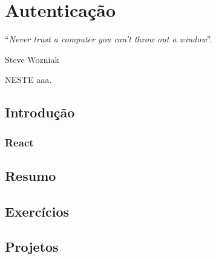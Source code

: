 \chapter{Autenticação}\label{cap:autenticacao}
\epigraph{``\textit{Never trust a computer you can't throw out a window}''.}{Steve Wozniak}

\lettrine[lines=4, lhang=0.1, lraise=0, loversize=0.2, findent=0.1em]{\textcolor{corTema}{N}}{ESTE} aaa.

\vfill

\section{Introdução}



\subsection{React}

\section{Resumo}

\section{Exercícios}

\section{Projetos}
